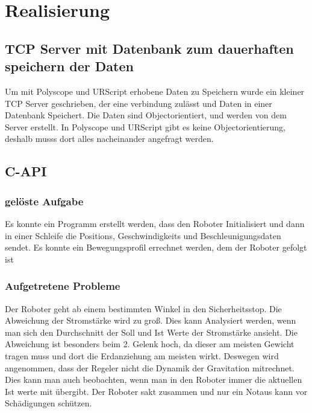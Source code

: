 \chapter{Realisierung}
\label{chap:umsetzung}

\section{TCP Server mit Datenbank zum dauerhaften speichern der Daten}
\label{sec:tcp_datentank_sicherung_rel}

Um mit Polyscope und URScript erhobene Daten zu Speichern wurde ein kleiner TCP Server geschrieben, der eine verbindung zulässt und Daten in einer Datenbank Speichert. Die Daten sind Objectorientiert, und werden von dem Server erstellt. 
In Polyscope und URScript gibt es keine Objectorientierung, deshalb musss dort alles nacheinander angefragt werden. 

\section{C-API}
\label{sec:capi_rel}


\subsection{gelöste Aufgabe}
\label{sub:capi-problems_rel}

Es konnte ein Programm erstellt werden, dass den Roboter Initialisiert und dann in einer Schleife die Positions, Geschwindigkeits und Beschleunigungsdaten sendet. Es konnte ein Bewegungsprofil errechnet werden, dem der Roboter gefolgt ist

\subsection{Aufgetretene Probleme}
\label{sub:capi-problems_rel}

Der Roboter geht ab einem bestimmten Winkel in den Sicherheitsstop. Die Abweichung der Stromstärke wird zu groß. Dies kann Analysiert werden, wenn man sich den Durchschnitt der Soll und Ist Werte der Stromstärke ansieht. Die Abweichung ist besonders beim 2. Gelenk hoch, da dieser am meisten Gewicht tragen muss und dort die Erdanziehung am meisten wirkt. Deswegen wird angenommen, dass der Regeler nicht die Dynamik der Gravitation mitrechnet. Dies kann man auch beobachten, wenn man in den Roboter immer die aktuellen Ist werte mit übergibt. Der Roboter sakt zusammen und nur ein Notaus kann vor Schädigungen schützen.

